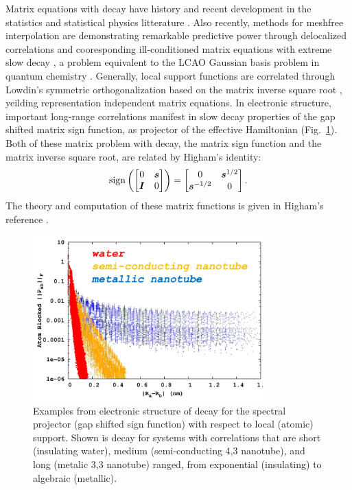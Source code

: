 \documentclass[letterpaper,twocolumn,amsmath,amsfont,amssymb,english,aps,jcp,preprintnumbers,groupaddress,nofootinbib,tightenlines,floatfix]{revtex4}
\newcommand{\mat}[1]{\boldsymbol{#1}}
\theoremstyle{plain}
\theoremstyle{remark}
\theoremstyle{plain}
\begin{document}
Matrix equations with decay have history and recent development in the statistics and statistical physics litterature
\cite{penrose1974,voit00, Anselin2003, Hardin2013, Krishtal2014}.   Also recently, methods for meshfree interpolation 
are demonstrating remarkable predictive power through delocalized correlations and cooresponding 
ill-conditioned matrix equations with extreme slow decay \cite{}, a problem equivalent to the LCAO Gaussian basis problem 
in quantum chemistry \cite{}.  Generally, local support functions are correlated 
through Lowdin's symmetric orthogonalization based on the matrix inverse square root \cite{Lowdin56, naidu11}, 
yeilding representation independent matrix equations. 
In electronic structure, important long-range correlations manifest in slow decay properties 
of the gap shifted matrix sign function, as projector of the effective Hamiltonian (Fig.~\ref{figure1}).  
Both of these matrix problem with decay, the matrix sign function and the matrix inverse square root, 
are related by Higham's identity:
\begin{equation}
\rm{sign} \left( \begin{bmatrix} 0 & \mat{s}      \\ \mat{I}       & 0\end{bmatrix} \right)  =
                 \begin{bmatrix} 0 & \mat{s}^{1/2} \\ \mat{s}^{-1/2} & 0\end{bmatrix}  .
\end{equation}
The theory and computation of these matrix functions is given in Higham's reference \cite{Higham08}.

\begin{figure}[h]\label{figure1}
 \includegraphics[width=3.5in]{decay_picture.png}
  \caption{Examples from electronic structure of decay for the
    spectral projector (gap shifted sign function) with respect to
    local (atomic) support.  Shown is decay for systems with
    correlations that are short (insulating water), medium
    (semi-conducting 4,3 nanotube), and long (metalic 3,3 nanotube)
    ranged, from exponential (insulating) to algebraic (metallic). }
\end{figure}
\end{document}
